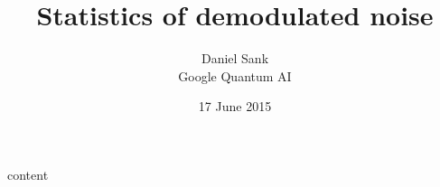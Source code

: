 \documentclass{article}
\title{Statistics of demodulated noise}
\author{Daniel Sank\\ \small{Google Quantum AI}}
\date{17 June 2015}
\begin{document}
\maketitle

\begin{abstract}

\end{abstract}

{content}



\end{document}
